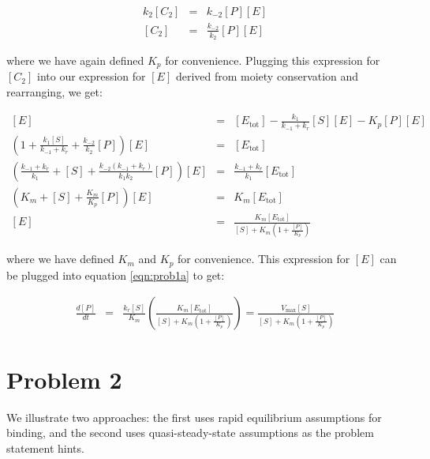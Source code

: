 \documentclass{article}
\begin{document}
\begin{eqnarray*}
k_2 \left[ C_2 \right] & = & k_{-2} \left[ P \right] \left[ E \right]\\
\left[ C_2 \right] & = & \frac{k_{-2} }{k_2} \left[ P \right] \left[ E \right]
\end{eqnarray*}

where we have again defined $K_p$ for convenience. Plugging this expression for $[C_2]$ into our expression for $[E]$ derived from moiety conservation and rearranging, we get:

\begin{eqnarray*}
 \left[ E\right] & = & \left[ E_{\textrm{tot}} \right] - \frac{k_1}{k_{-1} + k_r} \left[ S \right] \left[ E \right] - K_p \left[ P \right] \left[ E \right]\\
 \left(1 + \frac{k_1 \left[ S \right]}{k_{-1} + k_r} + \frac{k_{-2} }{k_2}  \left[ P \right] \right) \left[ E \right]   & = & \left[ E_{\textrm{tot}} \right]\\
  \left(\frac{k_{-1}+k_r}{k_1} + \left[ S \right]+ \frac{k_{-2} \left(k_{-1}+k_r \right)}{k_1k_2}  \left[ P \right] \right) \left[ E \right]   & = & \frac{k_{-1}+k_r}{k_1} \left[ E_{\textrm{tot}} \right]\\
   \left( K_m + \left[ S \right] + \frac{K_m}{K_p} \left[ P \right] \right) \left[ E \right] & = & K_m \left[ E_{\textrm{tot}} \right]\\
 \left[ E \right] & = & \frac{K_m \left[ E_{\textrm{tot}} \right]}{\left[ S \right] + K_m \left(1 + \frac{\left[ P \right]}{K_p} \right)}
\end{eqnarray*}

where we have defined $K_m$ and $K_p$ for convenience. This expression for $[E]$ can be plugged into equation \ref{eqn:prob1a} to get:

\begin{eqnarray*}
 \frac{d\left[ P \right]}{dt}  & = & \frac{k_r \left[ S \right]}{K_m} \left( \frac{K_m \left[ E_{\textrm{tot}} \right]}{\left[ S \right] + K_m \left(1 + \frac{\left[ P \right]}{K_p}  \right)} \right)  = \frac{V_{\textrm{max}} \left[ S \right]}{\left[ S \right] + K_m \left(1 + \frac{\left[ P \right]}{K_p} \right)}
 \end{eqnarray*}
 
 \section*{Problem 2}

We illustrate two approaches: the first uses rapid equilibrium assumptions for binding, and the second uses quasi-steady-state assumptions as the problem statement hints.
\end{document}
